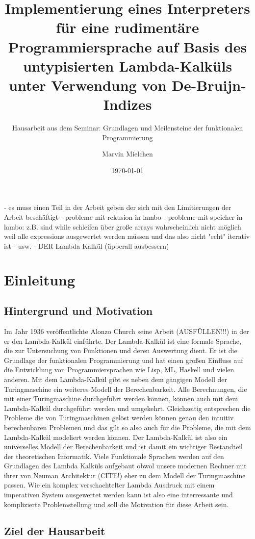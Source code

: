\documentclass{article}
\title{Implementierung eines Interpreters für eine rudimentäre Programmiersprache auf Basis des untypisierten Lambda-Kalküls unter Verwendung von De-Bruijn-Indizes}
\author{Marvin Mielchen}
\subtitle{Hausarbeit aus dem Seminar: Grundlagen und Meilensteine der funktionalen Programmierung}
\date{\today}
\begin{document}
\maketitle

- es muss einen Teil in der Arbeit geben der sich mit den Limitierungen der Arbeit beschäftigt
    - probleme mit rekusion in lambo
    - probleme mit speicher in lambo: z.B. sind while schleifen über große arrays wahrscheinlich nicht möglich weil alle expressions ausgewertet werden müssen und
    das also nicht "echt" iterativ ist
    - usw.
- DER Lambda Kalkül (üpberall ausbessern)

\section{Einleitung}

\subsection{Hintergrund und Motivation}

Im Jahr 1936 veröffentlichte Alonzo Church seine Arbeit (AUSFÜLLEN!!!) in der er den Lambda-Kalkül einführte. 
Der Lambda-Kalkül ist eine formale Sprache, die zur Untersuchung von Funktionen und deren Auswertung dient. Er ist die Grundlage der funktionalen Programmierung und hat einen großen Einfluss auf die Entwicklung von Programmiersprachen wie Lisp, ML, Haskell und vielen anderen.
Mit dem Lambda-Kalkül gibt es neben dem gängigen Modell der Turingmaschine ein weiteres Modell der Berechenbarkeit. Alle Berechnungen, die mit einer Turingmaschine durchgeführt werden können, können auch mit dem Lambda-Kalkül durchgeführt werden und umgekehrt.
Gleichzeitig entsprechen die Probleme die von Turingmaschinen gelöst werden können genau den intuitiv berechenbaren Problemen und das gilt so also auch für die Probleme, die mit dem Lambda-Kalkül modeliert werden können.
Der Lambda-Kalkül ist also ein universelles Modell der Berechenbarkeit und ist damit ein wichtiger Bestandteil der theoretischen Informatik. Viele Funktionale Sprachen werden auf den Grundlagen des Lambda Kalküls aufgebaut obwol unsere modernen Rechner mit ihrer von Neuman Architektur (CITE!) eher zu dem Modell der Turingmaschine passen.
Wie ein komplex verschachtelter Lambda Ausdruck mit einem imperativen System ausgewertet werden kann ist also eine interressante und komplizierte Problemstellung und soll die Motivation für diese Arbeit sein.

\subsection{Ziel der Hausarbeit}
\end{document}
